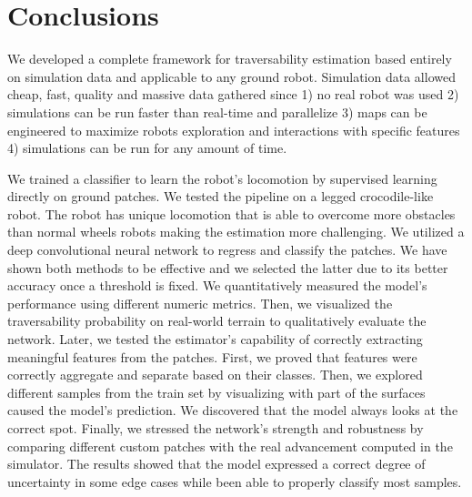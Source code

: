 \documentclass[../document.tex]{subfiles}
\begin{document}
\chapter{Conclusions}
\label{chap : conclusions}
We developed a complete framework for traversability estimation based entirely on simulation data and applicable to any ground robot. Simulation data allowed cheap, fast, quality and massive data gathered since 1) no real robot was used 2) simulations can be run faster than real-time and parallelize 3) maps can be engineered to maximize robots exploration and interactions with specific features 4) simulations can be run for any amount of time. 

We trained a classifier to learn the robot's locomotion by supervised learning directly on ground patches. We tested the pipeline on a legged crocodile-like robot. The robot has unique locomotion that is able to overcome more obstacles than normal wheels robots making the estimation more challenging.
We utilized a deep convolutional neural network to regress and classify the patches. We have shown both methods to be effective and we selected the latter due to its better accuracy once a threshold is fixed.
We quantitatively measured the model's performance using different numeric metrics. Then, we visualized the traversability probability on real-world terrain to qualitatively evaluate the network. Later, we tested the estimator's capability of correctly extracting meaningful features from the patches. First, we proved that features were correctly aggregate and separate based on their classes. Then, we explored different samples from the train set by visualizing with part of the surfaces caused the model's prediction. We discovered that the model always looks at the correct spot. Finally, we stressed the network's strength and robustness by comparing different custom patches with the real advancement computed in the simulator. The results showed that the model expressed a correct degree of uncertainty in some edge cases while been able to properly classify most samples.

\end{document}
